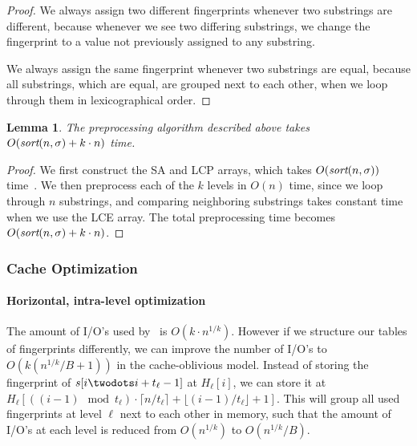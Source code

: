 \documentclass[a4]{article}
\newtheorem{lemma}{Lemma}
\begin{document}
\begin{proof}
We always assign two different fingerprints whenever two substrings are different, because whenever we see two differing substrings, we change the fingerprint to a value not previously assigned to any substring.

We always assign the same fingerprint whenever two substrings are equal, because all substrings, which are equal, are grouped next to each other, when we loop through them in lexicographical order.
\end{proof}

\begin{lemma}
The preprocessing algorithm described above takes $O(\textit{sort}(n,\sigma) + k\cdot n)$ time.
\end{lemma}

\begin{proof}
We first construct the SA and LCP arrays, which takes $O(\textit{sort}(n,\sigma))$ time~\cite{sort-complexity}. We then preprocess each of the $k$ levels in $O(n)$ time, since we loop through $n$ substrings, and comparing neighboring substrings takes constant time when we use the LCE array. The total preprocessing time becomes $O(\textit{sort}(n,\sigma)\\ + k\cdot n)$.
\end{proof}

\ifreport

\subsubsection{Cache Optimization\label{sec:fingerprint-cache}}

\paragraph{Horizontal, intra-level optimization}

The amount of I/O's used by \fprintk\ is $O(k\cdot n^{1/k})$. However if we structure our tables of fingerprints differently, we can improve the number of I/O's to $O(k(n^{1/k}/B+1))$ in the cache-oblivious model. Instead of storing the fingerprint of $s[i\twodots i+t_\ell-1]$ at $H_\ell[i]$, we can store it at $H_\ell[((i-1)\mod t_\ell)\cdot\lceil n/t_\ell\rceil+\lfloor (i-1)/t_\ell\rfloor+1]$. This will group all used fingerprints at level $\ell$ next to each other in memory, such that the amount of I/O's at each level is reduced from $O(n^{1/k})$ to $O(n^{1/k}/B)$.
\end{document}
